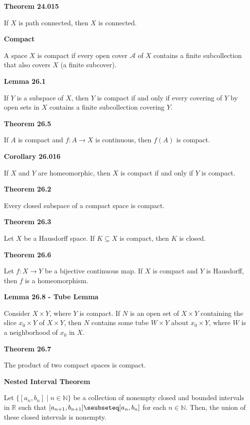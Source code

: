 \documentclass{article}
\begin{document}
\medskip\noindent\textbf{Theorem 24.015}

    If $X$ is path connected, then $X$ is connected.

\medskip\noindent\textbf{Compact}

    A space $X$ is compact if every open cover $\mathcal A$ of $X$ contains a finite subcollection that also covers $X$ (a finite subcover).

\medskip\noindent\textbf{Lemma 26.1}

    If $Y$ is a subspace of $X$, then $Y$ is compact if and only if every covering of $Y$ by open sets in $X$ contains a finite subcollection covering $Y$.

\medskip\noindent\textbf{Theorem 26.5}

    If $A$ is compact and $f: A \to X$ is continuous, then $f(A)$ is compact.

\medskip\noindent\textbf{Corollary 26.016}

    If $X$ and $Y$ are homeomorphic, then $X$ is compact if and only if $Y$ is compact.

\medskip\noindent\textbf{Theorem 26.2}

    Every closed subspace of a compact space is compact.

\medskip\noindent\textbf{Theorem 26.3}

    Let $X$ be a Hausdorff space. If $K \subseteq X$ is compact, then $K$ is closed.

\medskip\noindent\textbf{Theorem 26.6}

    Let $f: X \to Y$ be a bijective continuous map.
    If $X$ is compact and $Y$ is Hausdorff, then $f$ is a homeomorphism.

\medskip\noindent\textbf{Lemma 26.8 - Tube Lemma}

    Consider $X \times Y$, where $Y$ is compact.
    If $N$ is an open set of $X \times Y$ containing the slice $x_0 \times Y$ of $X \times Y$, then $N$ contains some tube $W \times Y$ about $x_0 \times Y$, where $W$ is a neighborhood of $x_0$ in $X$.

\medskip\noindent\textbf{Theorem 26.7}

    The product of two compact spaces is compact.

\medskip\noindent\textbf{Nested Interval Theorem}

    Let $\{[a_n,b_n] \mid n \in \mathbb N\}$ be a collection of nonempty closed and bounded intervals in $\mathbb R$ such that $[a_{n+1},b_{n+1}] \seubseteq [a_n, b_n]$ for each $n \in \mathbb N$.
    Then, the union of these closed intervals is nonempty.
\end{document}
